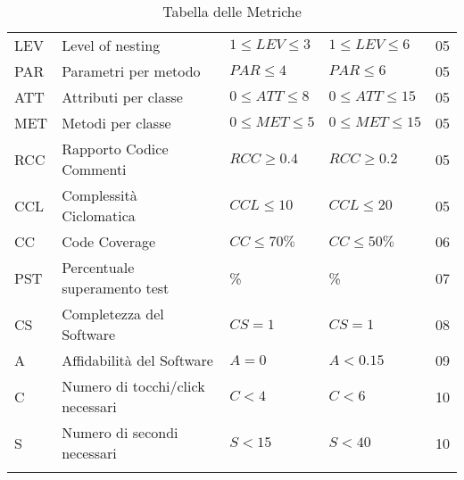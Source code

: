 \begin{longtable}{ 
		>{\centering}p{} 
		>{}p{}
        >{\centering}p{}
        >{\centering}p{}
        >{}p{} }
            LEV & Level of nesting & $1\leq LEV \leq 3$ & $1\leq LEV \leq 6$ & 05 \\

            PAR & Parametri per metodo & $PAR \leq 4$ & $PAR \leq 6$ & 05 \\

            ATT & Attributi per classe & $0 \leq ATT \leq 8$ & $0 \leq ATT \leq 15$ & 05 \\

            MET & Metodi per classe & $0 \leq MET \leq 5$ & $0 \leq MET \leq 15$ & 05 \\

            RCC & Rapporto Codice Commenti & $RCC \geq 0.4$ & $RCC \geq 0.2$  & 05 \\

            CCL & Complessità Ciclomatica & $CCL \leq 10 $ & $CCL \leq 20 $& 05 \\

            CC & Code Coverage & $CC\leq 70\%$ & $CC\leq 50\%$ & 06 \\

            PST & Percentuale superamento test & 100\% & 85\% & 07 \\


            CS & Completezza del Software & $CS=1$ & $CS=1$ & 08 \\

            A & Affidabilità del Software & $A=0$ & $A < 0.15$ & 09 \\

           C & Numero di tocchi/click necessari & $C<4$ & $C<6$& 10 \\

           S & Numero di secondi necessari & $S<15$ & $S<40$ & 10 \\

           
           \caption{Tabella delle Metriche}
        \end{longtable}


